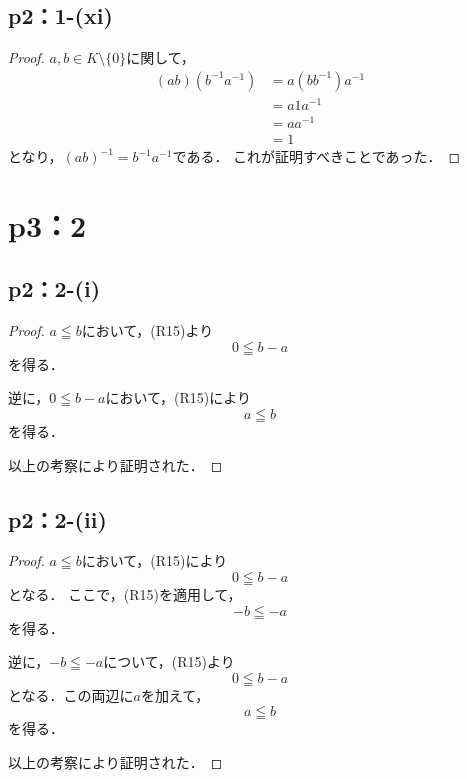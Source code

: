 \documentclass[a4paper,10pt,fleqn]{ltjsarticle}
\begin{document}
\subsection*{p2：1-(xi)}
\begin{leftbar}
    \begin{proof}
        $ a ,b\in K \setminus \{ 0 \} $に関して，
        \begin{align*}
            (ab) (b^{-1} a^{-1}) & = a (bb^{-1}) a^{-1} \\
                                 & = a1a^{-1}           \\
                                 & = aa^{-1}            \\
                                 & = 1
        \end{align*}
        となり，$(ab)^{-1} = b^{-1} a^{-1}$である．
        これが証明すべきことであった．
    \end{proof}
\end{leftbar}
%
\newpage
\section*{p3：2}

\subsection*{p2：2-(i)}

\begin{leftbar}
    \begin{proof}
        $a \leqq b$において，(R15)より
        \[
            0 \leqq b-a
        \]
        を得る．

        逆に，$0 \leqq b-a$において，(R15)により
        \[
            a \leqq b
        \]
        を得る．

        以上の考察により証明された．
    \end{proof}
\end{leftbar}

\subsection*{p2：2-(ii)}

\begin{leftbar}
    \begin{proof}
        $a \leqq b$において，(R15)により
        \[
            0 \leqq b-a
        \]
        となる．
        ここで，(R15)を適用して，
        \[
            -b \leqq -a
        \]
        を得る．

        逆に，$-b\leqq -a$について，(R15)より
        \[
            0 \leqq b -a
        \]
        となる．この両辺に$a$を加えて，
        \[
            a \leqq b
        \]
        を得る．

        以上の考察により証明された．
    \end{proof}
\end{leftbar}
\end{document}
